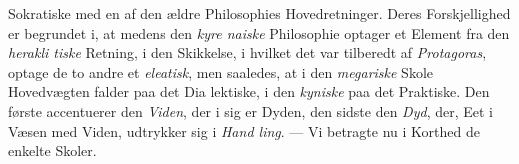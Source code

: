 \documentclass[12pt,a4paper]{book}
\newcommand{\divrule}{\begin{center}\rule{2cm}{0.4pt}\end{center}}
\begin{document}
Sokratiske med en af den ældre Philosophies Hovedretninger.
Deres Forskjellighed er begrundet i, at medens den \emph{kyre\-%
naiske} Philosophie optager et Element fra den \emph{herakli\-%
tiske} Retning, i den Skikkelse, i hvilket det var tilberedt af
\emph{Protagoras}, optage de to andre et \emph{eleatisk}, men saaledes,
at i den \emph{megariske} Skole Hovedvægten falder paa det Dia\-%
lektiske, i den \emph{kyniske} paa det Praktiske. Den første
accentuerer den \emph{Viden}, der i sig er Dyden, den sidste den
\emph{Dyd}, der, Eet i Væsen med Viden, udtrykker sig i \emph{Hand\-%
ling}. --- Vi betragte nu i Korthed de enkelte Skoler.

%
%
%
\end{document}
